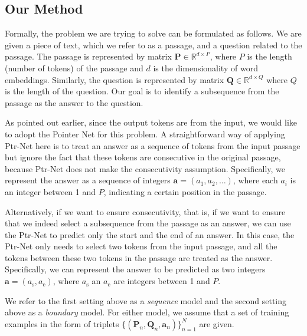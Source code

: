 \documentclass{article} \usepackage{iclr2017_conference,times}
\def\ignore#1{}
\begin{document}
\subsection{Our Method}

Formally, the problem we are trying to solve can be formulated as follows.
We are given a piece of text, which we refer to as a passage, and a question related to the passage.
The passage is represented by matrix $\mathbf{P} \in \mathbb{R}^{d \times P}$, where $P$ is the length (number of tokens) of the passage and $d$ is the dimensionality of word embeddings.
Similarly, the question is represented by matrix $\mathbf{Q} \in \mathbb{R}^{d \times Q}$ where $Q$ is the length of the question.
Our goal is to identify a subsequence from the passage as the answer to the question.

As pointed out earlier, since the output tokens are from the input, we would like to adopt the Pointer Net for this problem.
A straightforward way of applying Ptr-Net here is to treat an answer as a sequence of tokens from the input passage but ignore the fact that these tokens are consecutive in the original passage, because Ptr-Net does not make the consecutivity assumption.
Specifically, we represent the answer as a sequence of integers $\mathbf{a} = (a_1, a_2, \ldots)$, where each $a_i$ is an integer between 1 and $P$, indicating a certain position in the passage.

Alternatively, if we want to ensure consecutivity, that is, if we want to ensure that we indeed select a subsequence from the passage as an answer, we can use the Ptr-Net to predict only the start and the end of an answer.
In this case, the Ptr-Net only needs to select two tokens from the input passage, and all the tokens between these two tokens in the passage are treated as the answer.
Specifically, we can represent the answer to be predicted as two integers $\mathbf{a} = (a_\text{s}, a_\text{e})$, where $a_\text{s}$ an $a_\text{e}$ are integers between 1 and $P$.

We refer to the first setting above as a \emph{sequence} model and the second setting above as a \emph{boundary} model.
For either model, we assume that a set of training examples in the form of triplets $\{(\mathbf{P}_n, \mathbf{Q}_n, \mathbf{a}_n)\}_{n=1}^N$ are given.

\ignore{
Normally we could uniquely represent a subsequence by the positions of the start and the end of the subsequence in the original sequence.
In this paper, however, because we want to directly apply Pointer Net, we assume a relaxed setting in which we take tokens not necessarily consecutive in the given passage to form an answer.
We thus represent the answer as a sequence of integers $\mathbf{a} = (a_1, a_2, \ldots)$, where each $a_i$ is an integer between 1 and $P$, indicating a certain position in the passage.
We assume that a set of training examples in the form of triplets $\{(\mathbf{P}_n, \mathbf{Q}_n, \mathbf{a}_n)\}_{n=1}^N$ are given.
}
\end{document}
